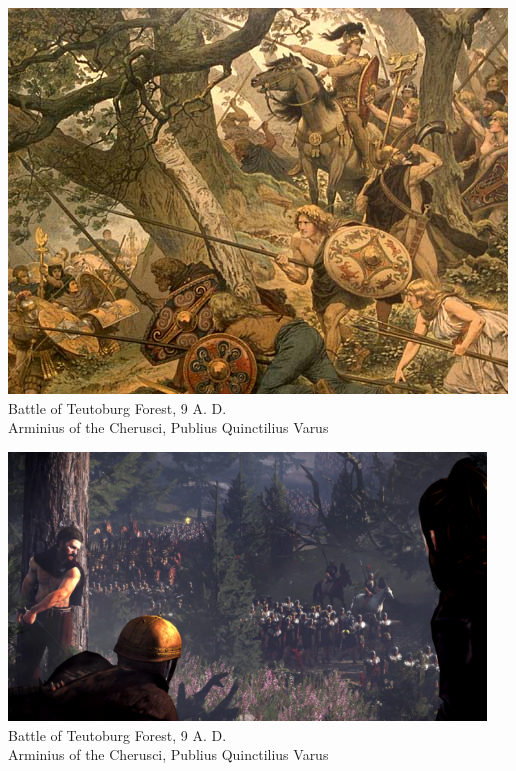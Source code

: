 \begin{frame}
    \centering
    \includegraphics[height=0.8\textheight]{img/teut3.jpg} \\
    Battle of Teutoburg Forest, 9 A. D. \\
        Arminius of the Cherusci, Publius Quinctilius Varus \\
\end{frame}

\begin{frame}
    \centering
    \includegraphics[width=0.95\textwidth]{img/teut4.png} \\
    Battle of Teutoburg Forest, 9 A. D. \\
        Arminius of the Cherusci, Publius Quinctilius Varus \\
\end{frame}

